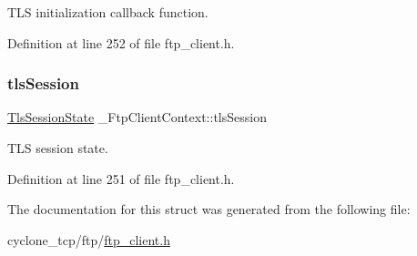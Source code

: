 T\+LS initialization callback function. 



Definition at line 252 of file ftp\+\_\+client.\+h.

\mbox{\label{struct__FtpClientContext_aafc5020fa59568008f8e0bc944fead48}} 
\subsubsection{\texorpdfstring{tls\+Session}{tlsSession}}
{\footnotesize\ttfamily \hyperlink{structTlsSessionState}{Tls\+Session\+State} \+\_\+\+Ftp\+Client\+Context\+::tls\+Session}



T\+LS session state. 



Definition at line 251 of file ftp\+\_\+client.\+h.



The documentation for this struct was generated from the following file\+:\begin{DoxyCompactItemize}
\item 
cyclone\+\_\+tcp/ftp/\hyperlink{ftp__client_8h}{ftp\+\_\+client.\+h}\end{DoxyCompactItemize}
